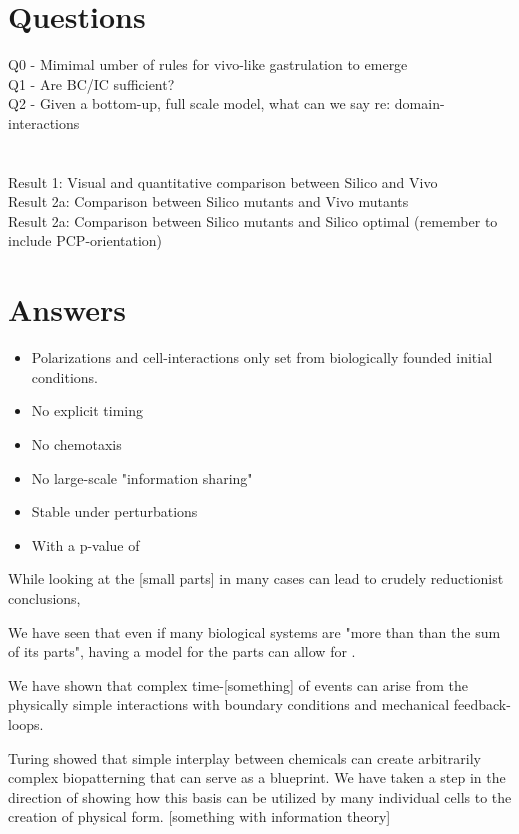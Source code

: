 \section{Questions}

Q0 - Mimimal umber of rules for vivo-like gastrulation to emerge\\
Q1 - Are BC/IC sufficient?\\
Q2 - Given a bottom-up, full scale model, what can we say re: domain-interactions\\
\\\\
Result 1: Visual and quantitative comparison between Silico and Vivo\\
Result 2a: Comparison between Silico mutants and Vivo mutants\\
Result 2a: Comparison between Silico mutants and Silico optimal (remember to include PCP-orientation)\\

\section{Answers}
\begin{itemize}
    \item Polarizations and cell-interactions only set from biologically founded initial conditions.
    \item No explicit timing
    \item No chemotaxis
    \item No large-scale "information sharing"
    \item Stable under perturbations
    \item With a p-value of 
\end{itemize}

While looking at the [small parts] in many cases can lead to crudely reductionist conclusions, 

We have seen that even if many biological systems are "more than than the sum of its parts", having a model for the parts can allow for .

We have shown that complex time-[something] of events can arise from the physically simple interactions with boundary conditions and mechanical feedback-loops.

Turing showed that simple interplay between chemicals can create arbitrarily complex biopatterning that can serve as a blueprint. We have taken a step in the direction of showing how this basis can be utilized by many individual cells to the creation of physical form.  [something with information theory] 


